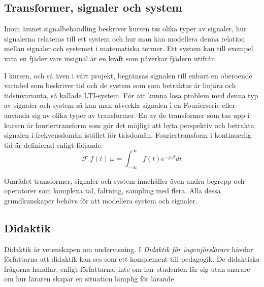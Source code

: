 \documentclass[12pt,a4paper,twoside,openright]{article}
\begin{document}
\subsection{Transformer, signaler och system}
Inom ämnet signalbehandling beskriver kursen \gls{tss} olika typer av
signaler, hur signalerna relateras till ett system och hur man kan
modellera denna relation mellan signaler och systemet i matematiska
termer. Ett system kan till exempel vara en fjäder vars insignal är en
kraft som påverkar fjädern utifrån.

I kursen, och så även i vårt projekt, begränsas signalen till enbart
en oberoende variabel som beskriver tid och de system som som
betraktas är linjära och tidsinvarianta, så kallade LTI-system. För
att kunna lösa problem med denna typ av signaler och system så kan man
utveckla signalen i en Fourierserie eller använda sig av olika typer
av transformer. En av de transformer som tas upp i kursen är
fouriertransform som gör det möjligt att byta perspektiv och betrakta
signalen i frekvensdomän istället för tidsdomän.
%
%
Fouriertransform i kontinuerlig tid är definierad enligt följande:
\[\mathcal{F}~f(t)~\omega = \int_{-\infty}^{\infty} f(t) e^{-j \omega t} dt\]
%
%
%
%

Området transformer, signaler och system innehåller även andra begrepp
och operatorer som komplexa tal, faltning, sampling med flera. Alla
dessa grundkunskaper behövs för att modellera system och signaler.

\subsection{Didaktik}
\label{sec:didaktik}
Didaktik är vetenskapen om undervisning. I \textit{Didaktik för
  ingenjörslärare}\cite{didaktik_for_ingenjorslarare} hävdar
författarna att didaktik kan ses som ett komplement till pedagogik. De
didaktiska frågorna handlar, enligt författarna, inte om hur studenten
lär sig utan snarare om hur läraren skapar en situation lämplig för
lärande.
\end{document}
